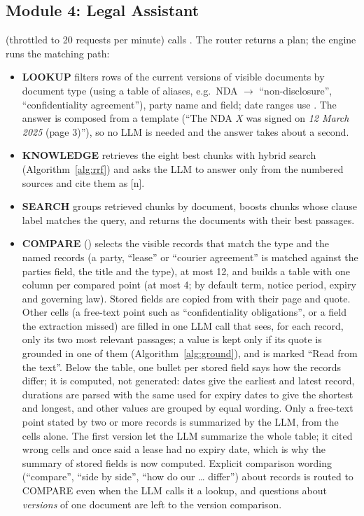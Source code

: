 \subsection{Module 4: Legal Assistant}
 (throttled to 20 requests per minute) calls . The router returns a plan; the engine runs the matching path:
\begin{itemize}
\item \textbf{LOOKUP} filters  rows of the current versions of visible documents by
document type (using a table of aliases, e.g.\ NDA $\rightarrow$ ``non-disclosure'', ``confidentiality
agreement''), party name and field; date ranges use . The answer is composed from a
template (``The NDA \emph{X} was signed on \emph{12 March 2025} (page 3)''), so no LLM is needed and
the answer takes about a second.
\item \textbf{KNOWLEDGE} retrieves the eight best chunks with hybrid search (Algorithm~\ref{alg:rrf})
and asks the LLM to answer only from the numbered sources and cite them as [n].
\item \textbf{SEARCH} groups retrieved chunks by document, boosts chunks whose clause label matches the
query, and returns the documents with their best passages.
\item \textbf{COMPARE} () selects the visible records that match the type and the
named records (a party, ``lease'' or ``courier agreement'' is matched against the parties field, the title
and the type), at most 12, and builds a table with one column per compared point (at most 4; by default
term, notice period, expiry and governing law). Stored fields are copied from  with their
page and quote. Other cells (a free-text point such as ``confidentiality obligations'', or a field the
extraction missed) are filled in one LLM call that sees, for each record, only its two most relevant
passages; a value is kept only if its quote is grounded in one of them (Algorithm~\ref{alg:ground}), and
is marked ``Read from the text''. Below the table, one bullet per stored field says how the records differ;
it is computed, not generated: dates give the earliest and latest record, durations are parsed with the
same  used for expiry dates to give the shortest and longest, and other values are grouped
by equal wording. Only a free-text point stated by two or more records is summarized by the LLM, from the
cells alone. The first version let the LLM summarize the whole table; it cited wrong cells and once said a
lease had no expiry date, which is why the summary of stored fields is now computed. Explicit comparison
wording (``compare'', ``side by side'', ``how do our \dots{} differ'') about records is routed to COMPARE even
when the LLM calls it a lookup, and questions about \emph{versions} of one document are left to the
version comparison.
\end{itemize}
